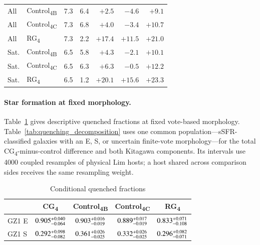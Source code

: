 \documentclass{aa}
\newcommand{\CB}{Control\textsubscript{4B}}
\newcommand{\CC}{Control\textsubscript{4C}}
\newcommand{\CG}{CG\textsubscript{4}}
\newcommand{\RG}{RG\textsubscript{4}}
\begin{document}
\begin{appendix}
\begin{table}
\begin{tabular}{llrrrrr}
All & \CB{} & 7.3 & 6.4 & \(+2.5\) & \(-4.6\) & \(+9.1\) \\


All & \CC{} & 7.3 & 6.8 & \(+4.0\) & \(-3.4\) & \(+10.7\) \\


All & \RG{} & 7.3 & 2.2 & \(+17.4\) & \(+11.5\) & \(+21.0\) \\




Sat. & \CB{} & 6.5 & 5.8 & \(+4.3\) & \(-2.1\) & \(+10.1\) \\


Sat. & \CC{} & 6.5 & 6.3 & \(+6.3\) & \(-0.5\) & \(+12.2\) \\


Sat. & \RG{} & 6.5 & 1.2 & \(+20.1\) & \(+15.6\) & \(+23.3\) \\


\hline
\end{tabular}
\end{table}


\paragraph{Star formation at fixed morphology.}
Table~\ref{tab:quenched_by_morphology} gives descriptive quenched fractions at fixed vote-based morphology. Table~\ref{tab:quenching_decomposition} uses one common population---sSFR-classified galaxies with an E, S, or uncertain finite-vote morphology---for the total \CG{}-minus-control difference and both Kitagawa components. Its intervals use 4000 coupled resamples of physical Lim hosts; a host shared across comparison sides receives the same resampling weight.

\begin{table}
\centering
\caption{Conditional quenched fractions}
\label{tab:quenched_by_morphology}
\tabcolsep=4pt
\renewcommand{\arraystretch}{1.35}
\begin{tabular}{lcccc}
\hline\hline
 & \multicolumn{1}{c}{\CG} & \multicolumn{1}{c}{\CB} & \multicolumn{1}{c}{\CC} & \multicolumn{1}{c}{\RG} \\
\hline
GZ1 E & \(0.905^{+0.040}_{-0.064}\) & \(0.903^{+0.016}_{-0.019}\) & \(0.889^{+0.017}_{-0.019}\) & \(0.833^{+0.071}_{-0.108}\) \\
GZ1 S & \(0.292^{+0.098}_{-0.082}\) & \(0.361^{+0.026}_{-0.025}\) & \(0.332^{+0.026}_{-0.025}\) & \(0.296^{+0.082}_{-0.071}\) \\
\hline
\end{tabular}
\end{table}


\end{appendix}
\end{document}
